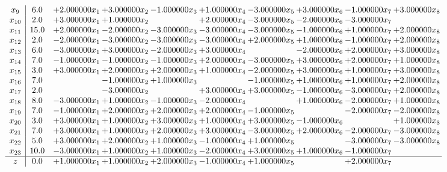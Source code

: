\documentclass[10pt]{article}
\begin{document}
\[\begin{array}{c| c c@{\hskip 2pt} c@{\hskip 2pt} c@{\hskip 2pt} c@{\hskip 2pt} c@{\hskip 2pt} c@{\hskip 2pt} c@{\hskip 2pt} c@{\hskip 2pt} }
 x_{9}   &  6.0 & + 2.000000 x_{1} & + 3.000000 x_{2} & -1.000000 x_{3} & + 1.000000 x_{4} & -3.000000 x_{5} & + 3.000000 x_{6} & -1.000000 x_{7} & + 3.000000 x_{8}\\
 x_{10}   &  2.0 & + 3.000000 x_{1} & + 1.000000 x_{2} &   & + 2.000000 x_{4} & -3.000000 x_{5} & -2.000000 x_{6} & -3.000000 x_{7} &   \\
 x_{11}   &  15.0 & + 2.000000 x_{1} & -2.000000 x_{2} & -3.000000 x_{3} & -3.000000 x_{4} & -3.000000 x_{5} & -1.000000 x_{6} & + 1.000000 x_{7} & + 2.000000 x_{8}\\
 x_{12}   &  2.0 & -2.000000 x_{1} & -3.000000 x_{2} & -3.000000 x_{3} & -3.000000 x_{4} & + 2.000000 x_{5} & + 1.000000 x_{6} & -1.000000 x_{7} & + 2.000000 x_{8}\\
 x_{13}   &  6.0 & -3.000000 x_{1} & + 3.000000 x_{2} & -2.000000 x_{3} & + 3.000000 x_{4} &   & -2.000000 x_{6} & + 2.000000 x_{7} & + 3.000000 x_{8}\\
 x_{14}   &  7.0 & -1.000000 x_{1} & -1.000000 x_{2} & -1.000000 x_{3} & + 2.000000 x_{4} & -3.000000 x_{5} & + 3.000000 x_{6} & + 2.000000 x_{7} & + 1.000000 x_{8}\\
 x_{15}   &  3.0 & + 3.000000 x_{1} & + 2.000000 x_{2} & + 2.000000 x_{3} & + 1.000000 x_{4} & -2.000000 x_{5} & + 3.000000 x_{6} & + 1.000000 x_{7} & + 3.000000 x_{8}\\
 x_{16}   &  7.0  &   & -1.000000 x_{2} & + 1.000000 x_{3} &   & -1.000000 x_{5} & + 1.000000 x_{6} & + 1.000000 x_{7} & + 2.000000 x_{8}\\
 x_{17}   &  2.0  &   & -3.000000 x_{2} &   & + 3.000000 x_{4} & + 3.000000 x_{5} & -1.000000 x_{6} & -3.000000 x_{7} & + 2.000000 x_{8}\\
 x_{18}   &  8.0 & -3.000000 x_{1} & + 1.000000 x_{2} & -1.000000 x_{3} & -2.000000 x_{4} &   & + 1.000000 x_{6} & -2.000000 x_{7} & + 1.000000 x_{8}\\
 x_{19}   &  7.0 & -1.000000 x_{1} & + 2.000000 x_{2} & + 2.000000 x_{3} & + 2.000000 x_{4} & -1.000000 x_{5} &   & -2.000000 x_{7} & -2.000000 x_{8}\\
 x_{20}   &  3.0 & + 3.000000 x_{1} & + 1.000000 x_{2} & + 3.000000 x_{3} & + 1.000000 x_{4} & + 3.000000 x_{5} & -1.000000 x_{6} &   & + 1.000000 x_{8}\\
 x_{21}   &  7.0 & + 3.000000 x_{1} & + 1.000000 x_{2} & + 2.000000 x_{3} & + 3.000000 x_{4} & -3.000000 x_{5} & + 2.000000 x_{6} & -2.000000 x_{7} & -3.000000 x_{8}\\
 x_{22}   &  5.0 & + 3.000000 x_{1} & + 2.000000 x_{2} & + 1.000000 x_{3} & -1.000000 x_{4} & + 1.000000 x_{5} &   & -3.000000 x_{7} & -3.000000 x_{8}\\
 x_{23}   &  10.0 & -3.000000 x_{1} & + 1.000000 x_{2} & + 1.000000 x_{3} & -2.000000 x_{4} & + 3.000000 x_{5} & + 1.000000 x_{6} & -1.000000 x_{7} &   \\
\hline
z    &  0.0 & + 1.000000 x_{1} & + 1.000000 x_{2} & + 2.000000 x_{3} & -1.000000 x_{4} & + 1.000000 x_{5} &   & + 2.000000 x_{7} &   \\
\end{array}\]
\end{document}
